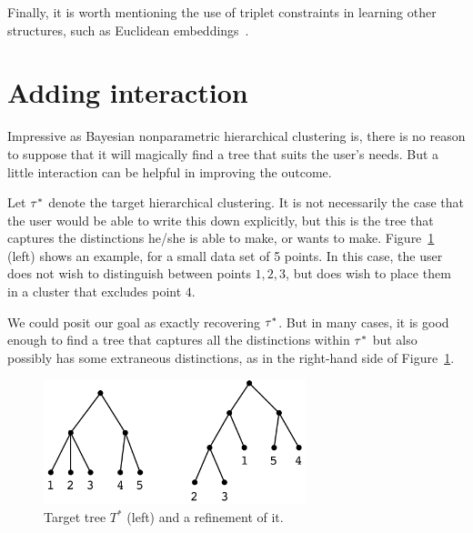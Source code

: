 Finally, it is worth mentioning the use of triplet constraints in learning other structures, such as Euclidean embeddings~\citep{Borg1997}.

\section{Adding interaction}

Impressive as Bayesian nonparametric hierarchical clustering is, there is no reason to suppose that it will magically find a tree that suits the user's needs. But a little interaction can be helpful in improving the outcome.

Let $\tau^*$ denote the target hierarchical clustering. It is not necessarily the case that the user would be able to write this down explicitly, but this is the tree that captures the distinctions he/she is able to make, or wants to make. Figure~\ref{fig:refinement} (left) shows an example, for a small data set of 5 points. In this case, the user does not wish to distinguish between points $1,2,3$, but does wish to place them in a cluster that excludes point $4$.

We could posit our goal as exactly recovering $\tau^*$. But in many cases, it is good enough to find a tree that captures all the distinctions within $\tau^*$ but also possibly has some extraneous distinctions, as in the right-hand side of Figure~\ref{fig:refinement}.

\begin{figure}
    \centering
    \includegraphics[width=3in]{img/ibhc/refinement.pdf}
    \caption{Target tree $T^*$ (left) and a refinement of it.}
    \label{fig:refinement}
\end{figure}

